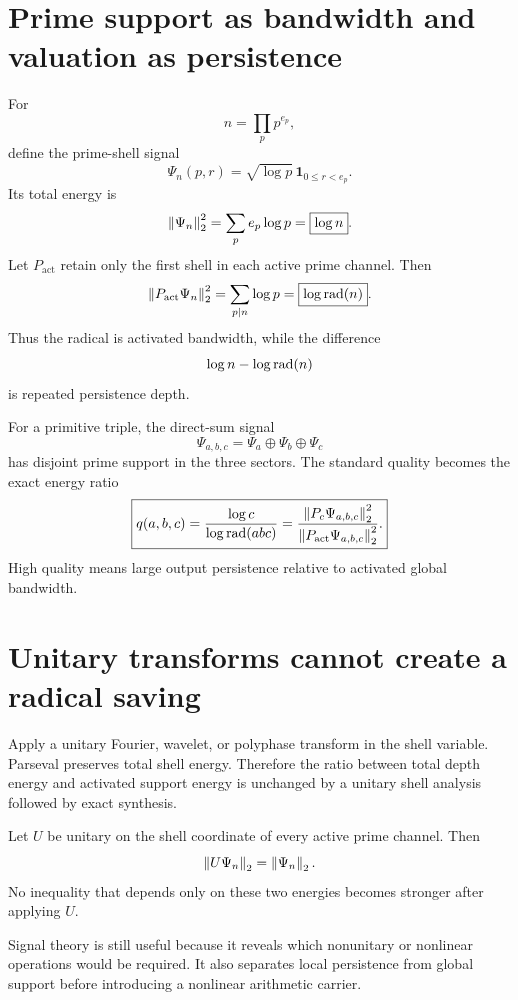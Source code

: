 
\section{Prime support as bandwidth and valuation as persistence}
For
\[
 n=\prod_p p^{e_p},
\]
define the prime-shell signal
\[
 \Psi_n(p,r)
 =
 \sqrt{\log p}\,\mathbf 1_{0\le r<e_p}.
\]
Its total energy is
\[
 \left\lVert\Psi_n\right\rVert_2^2
 =
 \sum_p e_p\log p
 =
 \boxed{\log n}.
\]
Let $P_{\mathrm{act}}$ retain only the first shell in each active prime channel. Then
\[
 \left\lVert P_{\mathrm{act}}\Psi_n\right\rVert_2^2
 =
 \sum_{p\mid n}\log p
 =
 \boxed{\log\operatorname{rad}(n)}.
\]
Thus the radical is activated bandwidth, while the difference
\[
 \log n-\log\operatorname{rad}(n)
\]
is repeated persistence depth.

For a primitive triple, the direct-sum signal
\[
 \Psi_{a,b,c}
 =
 \Psi_a\oplus\Psi_b\oplus\Psi_c
\]
has disjoint prime support in the three sectors. The standard quality becomes the exact energy ratio
\[
 \boxed{
 q(a,b,c)
 =
 \frac{\log c}{\log\operatorname{rad}(abc)}
 =
 \frac{\left\lVert P_c\Psi_{a,b,c}\right\rVert_2^2}
 {\left\lVert P_{\mathrm{act}}\Psi_{a,b,c}\right\rVert_2^2}.
 }
\]
High quality means large output persistence relative to activated global bandwidth.

\section{Unitary transforms cannot create a radical saving}
Apply a unitary Fourier, wavelet, or polyphase transform in the shell variable. Parseval preserves total shell energy. Therefore the ratio between total depth energy and activated support energy is unchanged by a unitary shell analysis followed by exact synthesis.

\begin{proposition}
Let $U$ be unitary on the shell coordinate of every active prime channel. Then
\[
 \left\lVert U\Psi_n\right\rVert_2=\left\lVert\Psi_n\right\rVert_2.
\]
No inequality that depends only on these two energies becomes stronger after applying $U$.
\end{proposition}

Signal theory is still useful because it reveals which nonunitary or nonlinear operations would be required. It also separates local persistence from global support before introducing a nonlinear arithmetic carrier.

